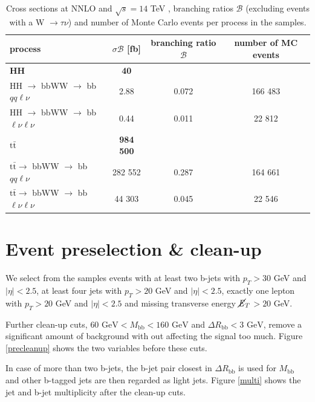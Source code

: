 \documentclass[10pt,a4paper]{article}
\renewcommand{\b}{\text{b}}
\renewcommand{\tt}{\ensuremath{\text{t}\bar{\text{t}}}}
\newcommand{\di}{$\rightarrow$ bbWW $\rightarrow$ bb$\ell\nu \ell\nu$}
\newcommand{\semi}{$\rightarrow$ bbWW $\rightarrow$ bb$qq\ell\nu$}
\newcommand{\BR}{\mathcal{B}}
\newcommand{\MET}{\ensuremath{\cancel{\it{E}}_{T}}}
\begin{document}
\begin{table}[h]
	\centering
	\caption{Cross sections at NNLO and $\sqrt{s}=14$ TeV \cite{sigma_HH}\cite{sigma_tt}, branching ratios $\BR$ (excluding events with a W $\rightarrow \tau\nu$) \cite{BR_HH}\cite{BR_tt}\cite{BR_W} and number of Monte Carlo events per process in the samples.} %
	\label{sigma}
	\begin{tabular}{@{\;}lccc@{\;}}
	\toprule
	process      & $\sigma\BR$ [fb] & branching ratio $\BR$ & number of MC events \\
	\midrule
	\textbf{HH}  & \textbf{40}      &           & \\ %
	HH \semi     &        2.88      &   0.072   &  166 483  \\
	HH \di       &        0.44      &   0.011   &   22 812  \\
	\textbf{\tt} & \textbf{984 500} &           & \\ %
	\tt \semi    &     282 552      &   0.287   &  164 661  \\
	\tt \di      &      44 303      &   0.045   &   22 546  \\
	\bottomrule
	\end{tabular}
\end{table}





\section{Event preselection \& clean-up}

We select from the samples events with at least two b-jets with $p_T > 30$ GeV and $|\eta| < 2.5$, at least four jets with $p_T > 20$ GeV and $|\eta| < 2.5$, exactly one lepton with $p_T > 20$ GeV and $|\eta| < 2.5$ and missing transverse energy \MET $> 20$ GeV. 

Further clean-up cuts, $60 \text{ GeV} < M_{\b\b} < 160 \text{ GeV}$ and $\Delta R_{\b\b} < 3 \text{ GeV}$, remove a significant amount of background with out affecting the signal too much. Figure \ref{precleanup} shows the two variables before these cuts.

In case of more than two b-jets, the b-jet pair closest in $\Delta R_{\b\b}$ is used for $M_{\b\b}$ and other b-tagged jets are then regarded as light jets. Figure \ref{multi} shows the jet and b-jet multiplicity after the clean-up cuts.
\end{document}
